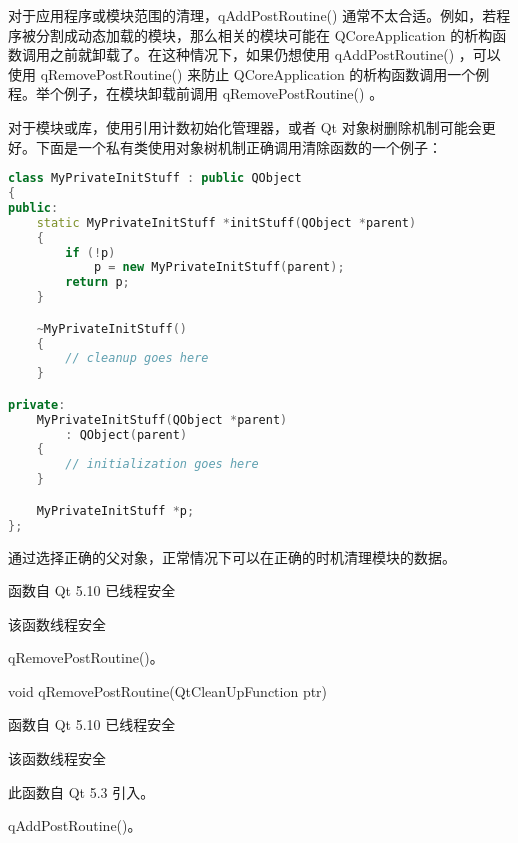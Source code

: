 \begin{notice}
对于应用程序或模块范围的清理，qAddPostRoutine() 通常不太合适。例如，若程序被分割成动态加载的模块，那么相关的模块可能在 QCoreApplication 的析构函数调用之前就卸载了。在这种情况下，如果仍想使用 qAddPostRoutine() ，可以使用 qRemovePostRoutine() 来防止 QCoreApplication 的析构函数调用一个例程。举个例子，在模块卸载前调用 qRemovePostRoutine() 。
\end{notice}

对于模块或库，使用引用计数初始化管理器，或者 Qt 对象树删除机制可能会更
好。下面是一个私有类使用对象树机制正确调用清除函数的一个例子：

\begin{lstlisting}[language=C++]
class MyPrivateInitStuff : public QObject
{
public:
    static MyPrivateInitStuff *initStuff(QObject *parent)
    {
        if (!p)
            p = new MyPrivateInitStuff(parent);
        return p;
    }

    ~MyPrivateInitStuff()
    {
        // cleanup goes here
    }

private:
    MyPrivateInitStuff(QObject *parent)
        : QObject(parent)
    {
        // initialization goes here
    }

    MyPrivateInitStuff *p;
};
\end{lstlisting}

通过选择正确的父对象，正常情况下可以在正确的时机清理模块的数据。

\begin{notice}
 函数自 Qt 5.10 已线程安全
\end{notice}

\begin{notice}
该函数线程安全
\end{notice}

\begin{notice}[另请参阅]
qRemovePostRoutine()。
\end{notice}


void qRemovePostRoutine(QtCleanUpFunction ptr)

\begin{notice}
函数自 Qt 5.10 已线程安全
\end{notice}

 

\begin{notice}
该函数线程安全
\end{notice}


此函数自 Qt 5.3 引入。



\begin{notice}[另请参阅]
qAddPostRoutine()。
\end{notice}

